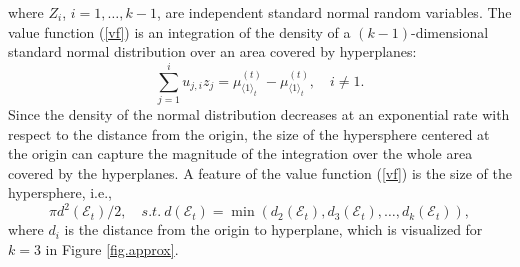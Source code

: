\documentclass[journal]{IEEEtran}
\begin{document}
where $Z_i$, $i=1,\ldots,k-1$, are independent standard normal random variables. The value function  (\ref{vf}) is an integration of the density of a $(k-1)$-dimensional standard normal distribution over an area covered by hyperplanes: $$\sum_{j=1}^{i}
u_{j,i}z_j = \mu_{\langle 1 \rangle_t}^{(t)}-\mu_{\langle 1 \rangle_t}^{(t)},\quad i\neq 1.$$
Since the density of the normal distribution decreases at an exponential rate with respect to the distance from the origin, the size of the hypersphere centered at the origin can capture the magnitude of the integration over the whole area covered by the hyperplanes. 
A feature of the  value function  (\ref{vf}) is the size of the hypersphere, i.e.,
 $$\pi d^2(\mathcal{E}_t)/2,\quad s.t. ~d(\mathcal{E}_t)=\min \left(d_{2}(\mathcal{E}_t), d_{3}(\mathcal{E}_t), \ldots, d_{k}(\mathcal{E}_t)\right),$$ where $d_{i}$
is the distance from the origin to hyperplane, which is visualized for $k=3$ in Figure \ref{fig.approx}. 
\end{document}
